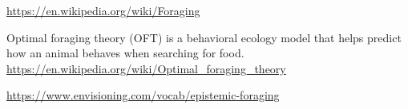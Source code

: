 \documentclass[a4paper]{article}
\title{}
\date{}
\begin{document}
    \maketitle
    \url{https://en.wikipedia.org/wiki/Foraging}
    
    Optimal foraging theory (OFT) is a behavioral ecology model that helps predict how an animal behaves when searching for food.
    \url{https://en.wikipedia.org/wiki/Optimal_foraging_theory}
    
    \url{https://www.envisioning.com/vocab/epistemic-foraging}
\end{document}
